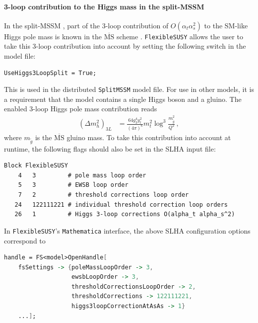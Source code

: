 \documentclass[final,3p,11pt,pdflatex]{elsarticle}
\makeatletter
\newcommand{\modelname}[1]{\texttt{#1}\@\xspace}
\newcommand{\fs}{\texttt{FlexibleSUSY}\@\xspace}
\newcommand{\mathematica}{\texttt{Ma\-the\-ma\-ti\-ca}\xspace}
\newcommand{\ol}[1]{\overline{#1}}
\newcommand{\MSbar}{\ensuremath{\ol{\text{MS}}}\xspace}
\def\at{\alpha_t}
\def\as{\alpha_s}
\makeatother
\begin{document}
\paragraph{3-loop contribution to the Higgs mass in the split-MSSM}

In the split-MSSM \cite{Bagnaschi:2014rsa}, part of the 3-loop
contribution of $O(\at \as^2)$
to the SM-like Higgs pole mass is known in the \MSbar
scheme \cite{Benakli:2013msa}.  \fs allows the user to take this
3-loop contribution into account by setting the following switch in
the model file:
%
\begin{lstlisting}
UseHiggs3LoopSplit = True;
\end{lstlisting}
%
This is used in the distributed \modelname{SplitMSSM} model file. For use in
other models, it is a requirement that the model contains a single
Higgs boson and a gluino.  The enabled 3-loop Higgs pole mass
contribution reads
%
\begin{align}
  (\Delta m_h^2)_{3L} &= \frac{64 g_3^4 y_t^2}{(4\pi)^6} m_t^2 \log^3\frac{m_{\tilde{g}}^2}{Q^2} \,,
\end{align}
%
where $m_{\tilde{g}}$ is the \MSbar gluino mass.  To take this
contribution into account at runtime, the following flags should also be
set in the SLHA input file:
%
\begin{lstlisting}
Block FlexibleSUSY
    4   3         # pole mass loop order
    5   3         # EWSB loop order
    7   2         # threshold corrections loop order
   24   122111221 # individual threshold correction loop orders
   26   1         # Higgs 3-loop corrections O(alpha_t alpha_s^2)
\end{lstlisting}
%
In \fs's \mathematica interface, the above SLHA configuration options
correspond to
%
\begin{lstlisting}[language=Mathematica]
handle = FS<model>OpenHandle[
    fsSettings -> {poleMassLoopOrder -> 3,
                   ewsbLoopOrder -> 3,
                   thresholdCorrectionsLoopOrder -> 2,
                   thresholdCorrections -> 122111221,
                   higgs3loopCorrectionAtAsAs -> 1}
    ...];
\end{lstlisting}
\end{document}
